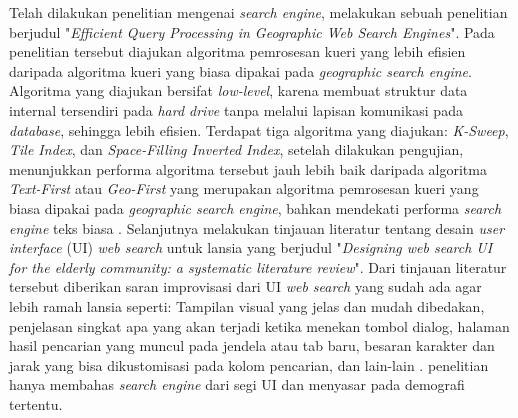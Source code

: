 Telah dilakukan penelitian mengenai \textit{search engine}, \citet{chenEtAl2006EfficientQuery} melakukan sebuah penelitian berjudul "\textit{Efficient Query Processing in Geographic Web Search Engines}". Pada penelitian tersebut diajukan algoritma pemrosesan kueri yang lebih efisien daripada algoritma kueri yang biasa dipakai pada \textit{geographic search engine}. Algoritma yang diajukan bersifat \textit{low-level}, karena membuat struktur data internal tersendiri pada \textit{hard drive} tanpa melalui lapisan komunikasi pada \textit{database}, sehingga lebih efisien. Terdapat tiga algoritma yang diajukan: \textit{K-Sweep}, \textit{Tile Index}, dan \textit{Space-Filling Inverted Index}, setelah dilakukan pengujian, menunjukkan performa algoritma tersebut jauh lebih baik daripada algoritma \textit{Text-First} atau \textit{Geo-First} yang merupakan algoritma pemrosesan kueri yang biasa dipakai pada \textit{geographic search engine}, bahkan mendekati performa \textit{search engine} teks biasa \citep{chenEtAl2006EfficientQuery}. Selanjutnya \citet{allahEtAl2021SearchUi} melakukan tinjauan literatur tentang desain \textit{user interface} (UI) \textit{web search} untuk lansia yang berjudul "\textit{Designing web search UI for the elderly community: a systematic literature review}". Dari tinjauan literatur tersebut diberikan saran improvisasi dari UI \textit{web search} yang sudah ada agar lebih ramah lansia seperti: Tampilan visual yang jelas dan mudah dibedakan, penjelasan singkat apa yang akan terjadi ketika menekan tombol dialog, halaman hasil pencarian yang muncul pada jendela atau tab baru, besaran karakter dan jarak yang bisa dikustomisasi pada kolom pencarian, dan lain-lain \citep{allahEtAl2021SearchUi}. penelitian \citet{allahEtAl2021SearchUi} hanya membahas \textit{search engine} dari segi UI dan menyasar pada demografi tertentu.

